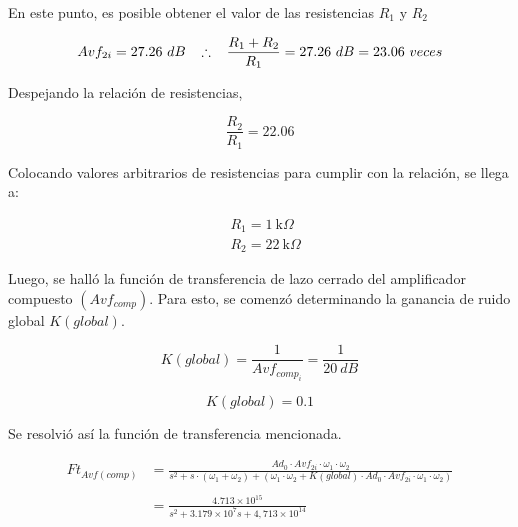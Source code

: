 \hspace{1mm} En este punto, es posible obtener el valor de las resistencias $R_1$ y $R_2$

\begin{equation}
    Avf_{2i}=27.26~dB \hspace{3mm} \therefore \hspace{3mm} \frac{R_1+R_2}{R_1}=27.26~dB = 23.06~veces
\end{equation}

\hspace{1mm} Despejando la relación de resistencias,

\begin{equation}
    \frac{R_2}{R_1} = 22.06
\end{equation}

\hspace{1mm} Colocando valores arbitrarios de resistencias para cumplir con la relación, se llega a:

\begin{equation}
    \boxed{
    \begin{aligned}
        &R_1=1~\text{k}\Omega \\
        &R_2=22~\text{k}\Omega
    \end{aligned}
    }
\end{equation}


 
\hspace{1mm} Luego, se halló la función de transferencia de lazo cerrado del amplificador compuesto $(Avf_{comp})$. Para esto, se comenzó determinando la ganancia de ruido global $ K(global) $.

\begin{equation}
    K (global) = \frac{1}{Avf_{comp_i}} = \frac{1}{20~dB}
\end{equation}

\begin{equation}
    \boxed{
    K (global) = 0.1
    }
\end{equation}

 
\hspace{1mm} Se resolvió así la función de transferencia mencionada.

\begin{align}
    Ft_{Avf (comp)} &= \frac{Ad_0 \cdot Avf_{2i} \cdot \omega_1 \cdot \omega_2}{s^2 + s \cdot (\omega_1 + \omega_2) + (\omega_1 \cdot \omega_2 + K (global) \cdot Ad_0 \cdot Avf_{2i} \cdot \omega_1 \cdot \omega_2)}\\
    \\
    &= \frac{4.713 \times 10^{15}}{s^2 + 3.179 \times 10^7 s + 4,713 \times 10^14}
\end{align}

